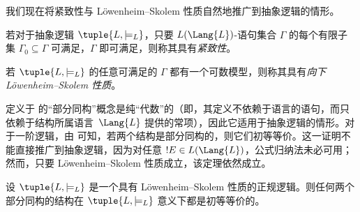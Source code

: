 \documentclass[../../../include/open-logic-section]{subfiles}
\begin{document}


我们现在将紧致性与 Löwenheim--Skolem 性质自然地推广到抽象逻辑的情形。

\begin{defn}
若对于抽象逻辑 $\tuple{L, \models_L}$，只要 $L(\Lang{L})$-语句集合 $\Gamma$ 的每个有限子集 $\Gamma_0 \subseteq \Gamma$ 可满足，$\Gamma$ 即可满足，则称其具有\emph{紧致性}。
\end{defn}

\begin{defn}
若 $\tuple{L, \models_L}$ 的任意可满足的 $\Gamma$ 都有一个可数模型，则称其具有\emph{向下 Löwenheim--Skolem 性质}。
\end{defn}

定义于  的“部分同构”概念是纯“代数”的（即，其定义不依赖于语言的语句，而只依赖于结构所属语言~$\Lang{L}$ 提供的常项），因此它适用于抽象逻辑的情形。对于一阶逻辑，由  可知，若两个结构是部分同构的，则它们初等等价。这一证明不能直接推广到抽象逻辑，因为对任意 $!E \in L(\Lang{L})$，公式归纳法未必可用；然而，只要 Löwenheim--Skolem 性质成立，该定理依然成立。

\begin{thm}
设 $\tuple{L, \models_L}$ 是一个具有 Löwenheim--Skolem 性质的正规逻辑。则任何两个部分同构的结构在 $\tuple{L, \models_L}$ 意义下都是初等等价的。
\end{thm}
\end{document}
